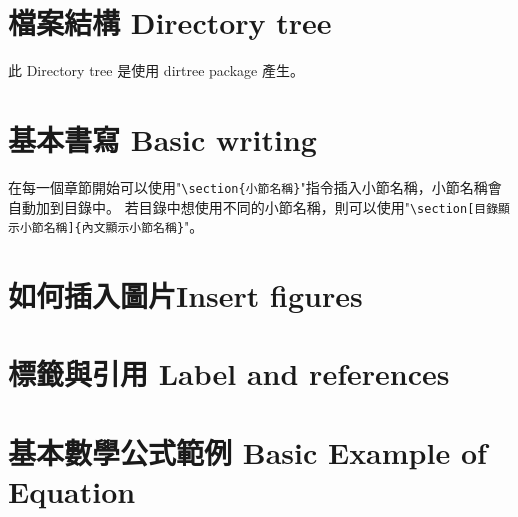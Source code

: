 \section{檔案結構 Directory tree}\label{sec:directory_tree}

\renewcommand\DTstyle{\rmfamily} %
此 Directory tree 是使用 dirtree package 產生。

\section{基本書寫 Basic writing}\label{sec:writing}
在每一個章節開始可以使用"\verb|\section{小節名稱}|"指令插入小節名稱，小節名稱會自動加到目錄中。
若目錄中想使用不同的小節名稱，則可以使用"\verb|\section[目錄顯示小節名稱]{內文顯示小節名稱}|"。


\section{如何插入圖片Insert figures}\label{sec:figure}

\section{標籤與引用 Label and references}\label{sec:Label_and_references}

\section{基本數學公式範例 Basic Example of Equation}\label{sec:Basic_Example_of_Equation}

